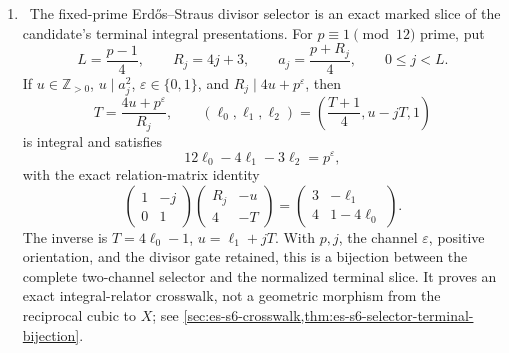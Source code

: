 \begin{enumerate}[leftmargin=1.8em]
\[
 (a,q,n)\longmapsto
 \gamma(a,q,n)=2+\frac{qI+aJ+nK}{2}
\]

identifies \(a^2-3q^2-18n^2=-2\), with its forced parity
\(a\equiv q\pmod2\), with the reduced-trace-\(4\), reduced-norm-\(1\) locus
of \(\mathcal O\).  Every such \(\gamma\) is primitive hyperbolic, with

\[
 \mathcal O\cap\mathbb Q(\gamma)
 =\mathbb Z[\gamma-2]\cong\mathbb Z[\sqrt3],\qquad
 C_{\mathcal O^1}(\gamma)=\{\pm\gamma^k:k\in\mathbb Z\},
\]

eigenvalues \(2\pm\sqrt3\), and translation length
\(2\log(2+\sqrt3)\).  The full shell is a finite union of
\(\mathcal O^1\)-conjugacy classes.  For the displayed real splitting, the
standard radial Huber parameter is exactly

\[
 X_i(\gamma)^2=1+\frac{(7a+15\sqrt2\,n)^2}{48},
\]

whereas the Koide height is \(4a+17n\).  Thus the hyperbolic reduction is
exact, but the radial theorem does not transfer a discrepancy estimate to
the sharp Koide polyhedron; see
\cref{koide-quat-exact-quaternion-bridge-order-shell-and-hyperbolic-conjugacy-classes,%
koide-quat-exact-reformulation-of-the-koide-chamber-count,%
koide-quat-consequence-for-the-open-square-root-discrepancy}.

\item \Verified\ The fixed-prime Erd\H{o}s--Straus divisor selector is an
exact marked slice of the candidate's terminal integral presentations.  For
\(p\equiv1\pmod{12}\) prime, put
\[
 L=\frac{p-1}{4},\qquad R_j=4j+3,\qquad
 a_j=\frac{p+R_j}{4},\qquad 0\le j<L.
\]
If \(u\in\mathbb Z_{>0}\), \(u\mid a_j^2\),
\(\varepsilon\in\{0,1\}\), and
\(R_j\mid4u+p^\varepsilon\), then
\[
 T=\frac{4u+p^\varepsilon}{R_j},\qquad
 (\ell_0,\ell_1,\ell_2)
 =\left(\frac{T+1}{4},u-jT,1\right)
\]
is integral and satisfies
\[
 12\ell_0-4\ell_1-3\ell_2=p^\varepsilon,
\]
with the exact relation-matrix identity
\[
 \begin{pmatrix}1&-j\\0&1\end{pmatrix}
 \begin{pmatrix}R_j&-u\\4&-T\end{pmatrix}
 =\begin{pmatrix}3&-\ell_1\\4&1-4\ell_0\end{pmatrix}.
\]
The inverse is \(T=4\ell_0-1\), \(u=\ell_1+jT\).  With \(p,j\), the
channel \(\varepsilon\), positive orientation, and the divisor gate retained,
this is a bijection between the complete two-channel selector and the
normalized terminal slice.  It proves an exact integral-relator crosswalk,
not a geometric morphism from the reciprocal cubic to \(X\); see
\cref{sec:es-s6-crosswalk,thm:es-s6-selector-terminal-bijection}.


\end{enumerate}
